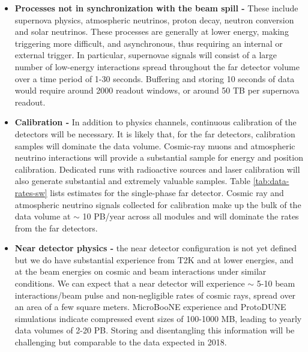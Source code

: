 \begin{itemize}




\item {\bf Processes not in synchronization with the beam spill -} These include supernova physics, atmospheric neutrinos, proton decay, neutron conversion and solar neutrinos.  These processes are generally at lower energy, making triggering more difficult, and asynchronous, thus requiring an internal or external trigger.  In particular, supernovae signals will consist of a large number of low-energy interactions spread throughout the far detector volume over a time period of 1-30 seconds. Buffering and storing 10 seconds of data would require around 2000 readout windows, or around 50 TB per supernova readout.  

\item
{\bf Calibration - }
In addition to physics channels, continuous calibration of the detectors will be necessary.  It is likely that, for the far detectors, calibration samples will  dominate the data volume. Cosmic-ray muons and atmospheric neutrino interactions will provide a substantial sample for energy and position calibration.  Dedicated runs with radioactive sources and laser calibration will also generate substantial and extremely valuable samples. Table \ref{tab:data-rates-sw} lists estimates for the single-phase far detector.   Cosmic ray and atmospheric neutrino signals collected for calibration make up the bulk of the data volume at $\sim$ 10 PB/year across all modules and will dominate the rates from the far detectors.  %

\item {\bf Near detector physics -} the near detector configuration is not yet defined  but we do have substantial experience from T2K and   at lower energies, and   at the   beam energies on cosmic and beam interactions under similar conditions.  We can expect that a near detector will experience $\sim$ 5-10 beam interactions/beam pulse and non-negligible rates of cosmic rays, spread over an area of a few square meters. MicroBooNE experience and ProtoDUNE simulations indicate compressed event sizes of 100-1000 MB, leading to yearly data volumes of 2-20 PB.  Storing and disentangling this information will be challenging but comparable to the  data expected in 2018.

\end{itemize}

